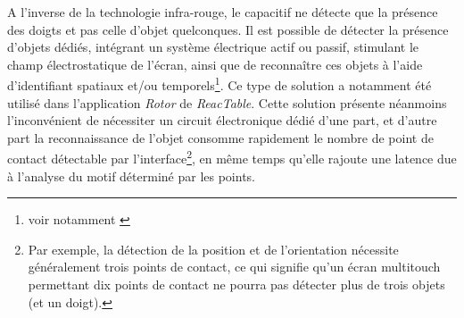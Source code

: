 \indent A l'inverse de la technologie infra-rouge, le capacitif ne détecte que la présence des doigts et pas celle d'objet quelconques. Il est possible de détecter la présence d'objets dédiés, intégrant un système électrique actif ou passif, stimulant le champ électrostatique de l'écran, ainsi que de reconnaître ces objets à l'aide d'identifiant spatiaux et/ou temporels\footnote{voir notamment \cite{rekimoto_datatiles_2001, yu_tuic_2011}}. Ce type de solution a notamment été utilisé dans l'application \textit{Rotor} de \textit{ReacTable}. Cette solution présente néanmoins l'inconvénient de nécessiter un circuit électronique dédié d'une part, et d'autre part la reconnaissance de l'objet consomme rapidement le nombre de point de contact détectable par l'interface\footnote{Par exemple, la détection de la position et de l'orientation nécessite généralement trois points de contact, ce qui signifie qu'un écran multitouch permettant dix points de contact ne pourra pas détecter plus de trois objets (et un doigt).}, en même temps qu'elle rajoute une latence due à l'analyse du motif déterminé par les points.

